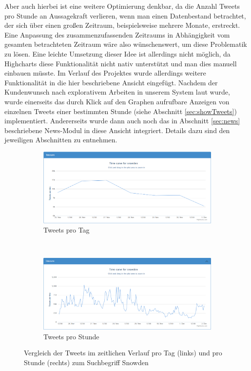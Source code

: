 Aber auch hierbei ist eine weitere Optimierung denkbar, da die Anzahl Tweets pro Stunde an Aussagekraft verlieren, wenn man einen Datenbestand betrachtet, der sich über einen großen Zeitraum, beispielsweise mehrere Monate, erstreckt. Eine Anpassung des zusammenzufassenden Zeitraums in Abhängigkeit vom gesamten betrachteten Zeitraum wäre also wünschenswert, um diese Problematik zu lösen. Eine leichte Umsetzung dieser Idee ist allerdings nicht möglich, da Highcharts diese Funktionalität nicht nativ unterstützt und man dies manuell einbauen müsste.
Im Verlauf des Projektes wurde allerdings weitere Funktionalität in die hier beschriebene Ansicht eingefügt. Nachdem der Kundenwunsch nach explorativem Arbeiten in unserem System laut wurde, wurde einerseits das durch Klick auf den Graphen aufrufbare Anzeigen von einzelnen Tweets einer bestimmten Stunde (siehe Abschnitt \ref{sec:showTweets}) implementiert. Andererseits wurde dann auch noch das in Abschnitt \ref{sec:news} beschriebene News-Modul in diese Ansicht integriert. Details dazu sind den jeweiligen Abschnitten zu entnehmen.

\begin{figure}[ht]
\centering
\begin{subfigure}[t]{0.45\textwidth}
\includegraphics[width=\textwidth]{Bilder/Frontend/snowdenOld.png}
\caption{Tweets pro Tag}
\label{fig:tphDay}
\end{subfigure}
~
\begin{subfigure}[t]{0.45\textwidth}
\includegraphics[width=\textwidth]{Bilder/Frontend/snowdenNew.png}
\caption{Tweets pro Stunde}
\label{fig:tphHour}
\end{subfigure}
\caption{Vergleich der Tweets im zeitlichen Verlauf pro Tag (links) und pro Stunde (rechts) zum Suchbegriff \glqq Snowden\grqq}
\label{fig:tphCompare}
\end{figure}

